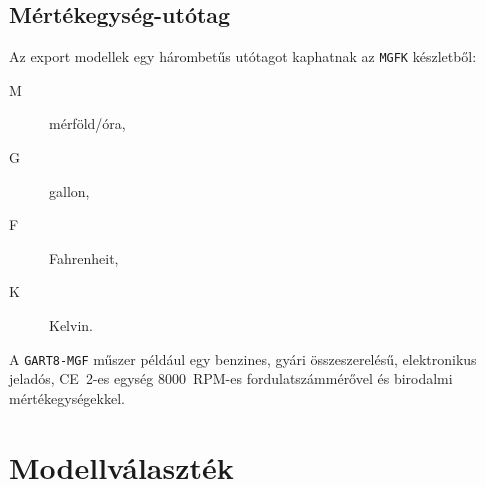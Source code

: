 \subsection{Mértékegység-utótag}
Az export modellek egy hárombetűs utótagot kaphatnak az \texttt{MGFK} készletből:
\begin{description}
    \item[M] mérföld/óra,
    \item[G] gallon,
    \item[F] Fahrenheit,
    \item[K] Kelvin.
\end{description}
A \texttt{GART8-MGF} műszer például egy benzines, gyári összeszerelésű, elektronikus jeladós, CE~2-es egység 8000~RPM-es fordulatszámmérővel és birodalmi mértékegységekkel.

\section{Modellválaszték}
